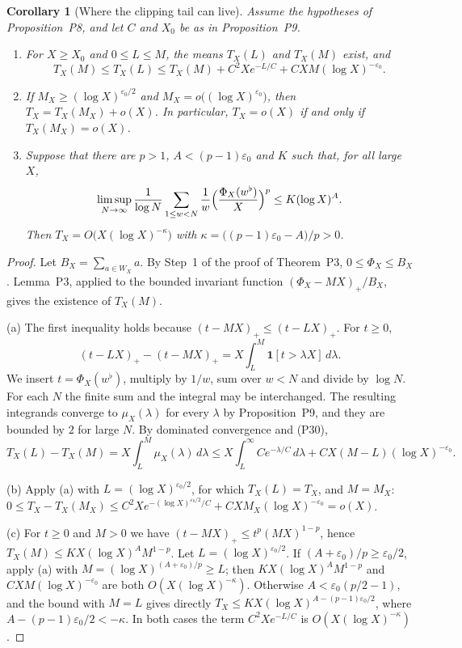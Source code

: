 \documentclass[11pt]{article}
\newtheorem{corollary}[theorem]{Corollary}
\theoremstyle{remark}
\begin{document}
\begin{corollary}[Where the clipping tail can live]
\label{cor:extreme-tail}
Assume the hypotheses of Proposition~P8, and
let $C$ and $X_0$ be as in Proposition~P9.
\begin{enumerate}[label=(\alph*)]
 \item For $X\ge X_0$ and $0\le L\le M$, the means $T_X(L)$ and $T_X(M)$
 exist, and
 \[
  T_X(M)\le T_X(L)\le T_X(M)+C^2Xe^{-L/C}+CXM(\log X)^{-\varepsilon_0}.
 \]
 \item If $M_X\ge(\log X)^{\varepsilon_0/2}$ and
 $M_X=o\bigl((\log X)^{\varepsilon_0}\bigr)$, then
 $T_X=T_X(M_X)+o(X)$. In particular, $T_X=o(X)$ if and only if
 $T_X(M_X)=o(X)$.
 \item Suppose that there are $p>1$, $A<(p-1)\varepsilon_0$ and $K$
 such that, for all large $X$,
 \[
  \limsup_{N\to\infty}\frac1{\log N}\sum_{1\le w<N}\frac1w
  \Bigl(\frac{\Phi_X(w^\flat)}X\Bigr)^p\le K(\log X)^A .
 \]
 Then $T_X=O\bigl(X(\log X)^{-\kappa}\bigr)$ with
 $\kappa=\bigl((p-1)\varepsilon_0-A\bigr)/p>0$.
\end{enumerate}
\end{corollary}

\begin{proof}
Let $B_X=\sum_{a\in W_X}a$. By Step~1 of the proof of
Theorem~P3, $0\le\Phi_X\le B_X$. Lemma~P3,
applied to the bounded invariant function $(\Phi_X-MX)_+/B_X$, gives the
existence of $T_X(M)$.

(a) The first inequality holds because $(t-MX)_+\le(t-LX)_+$. For
$t\ge0$,
\[
 (t-LX)_+-(t-MX)_+=X\int_L^M\mathbf 1[t>\lambda X]\,d\lambda .
\]
We insert $t=\Phi_X(w^\flat)$, multiply by $1/w$, sum over $w<N$ and
divide by $\log N$. For each $N$ the finite sum and the integral may be
interchanged. The resulting integrands converge to $\mu_X(\lambda)$ for
every $\lambda$ by Proposition~P9, and they are bounded
by $2$ for large $N$. By dominated convergence and (P30),
\[
 T_X(L)-T_X(M)=X\int_L^M\mu_X(\lambda)\,d\lambda
 \le X\int_L^\infty Ce^{-\lambda/C}\,d\lambda+CX(M-L)(\log X)^{-\varepsilon_0}.
\]

(b) Apply (a) with $L=(\log X)^{\varepsilon_0/2}$, for which
$T_X(L)=T_X$, and $M=M_X$:
$0\le T_X-T_X(M_X)\le C^2Xe^{-(\log X)^{\varepsilon_0/2}/C}
+CXM_X(\log X)^{-\varepsilon_0}=o(X)$.

(c) For $t\ge0$ and $M>0$ we have $(t-MX)_+\le t^p(MX)^{1-p}$, hence
$T_X(M)\le KX(\log X)^AM^{1-p}$. Let $L=(\log X)^{\varepsilon_0/2}$. If
$(A+\varepsilon_0)/p\ge\varepsilon_0/2$, apply (a) with
$M=(\log X)^{(A+\varepsilon_0)/p}\ge L$; then
$KX(\log X)^AM^{1-p}$ and $CXM(\log X)^{-\varepsilon_0}$ are both
$O(X(\log X)^{-\kappa})$. Otherwise $A<\varepsilon_0(p/2-1)$, and the
bound with $M=L$ gives directly
$T_X\le KX(\log X)^{A-(p-1)\varepsilon_0/2}$, where
$A-(p-1)\varepsilon_0/2<-\kappa$. In both cases the term
$C^2Xe^{-L/C}$ is $O(X(\log X)^{-\kappa})$.
\end{proof}
\end{document}
